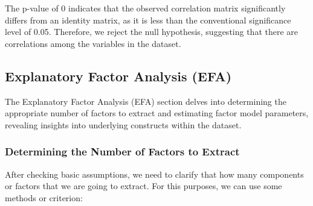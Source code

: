 \documentclass[11pt]{article}
\begin{document}
			
			The p-value of 0 indicates that the observed correlation matrix significantly differs from an identity matrix, as it is less than the conventional significance level of 0.05. Therefore, we reject the null hypothesis, suggesting that there are correlations among the variables in the dataset.
		\newpage
		\subsection{Explanatory Factor Analysis (EFA)}
		 The Explanatory Factor Analysis (EFA) section delves into determining the appropriate number of factors to extract and estimating factor model parameters, revealing insights into underlying constructs within the dataset.
			\subsubsection{Determining the Number of Factors to Extract}
			After checking basic assumptions, we need to clarify that how many components or factors that we are going to extract. For this purposes, we can use some methods or criterion:
		
\end{document}

